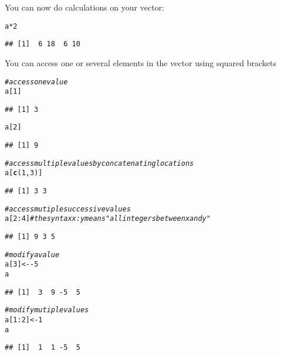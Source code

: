 \documentclass[12pt,a4paper]{scrartcl}\usepackage[]{graphicx}\usepackage[]{color}
\makeatletter
\newcommand{\hlnum}[1]{\textcolor[rgb]{0.686,0.059,0.569}{#1}}%
\newcommand{\hlcom}[1]{\textcolor[rgb]{0.678,0.584,0.686}{\textit{#1}}}%
\newcommand{\hlopt}[1]{\textcolor[rgb]{0,0,0}{#1}}%
\newcommand{\hlstd}[1]{\textcolor[rgb]{0.345,0.345,0.345}{#1}}%
\newcommand{\hlkwb}[1]{\textcolor[rgb]{0.69,0.353,0.396}{#1}}%
\newcommand{\hlkwd}[1]{\textcolor[rgb]{0.737,0.353,0.396}{\textbf{#1}}}%
\newenvironment{kframe}{%
 \def\at@end@of@kframe{}%
 \ifinner\ifhmode%
  \def\at@end@of@kframe{\end{minipage}}%
  \begin{minipage}{\columnwidth}%
 \fi\fi%
 \def\FrameCommand##1{\hskip\@totalleftmargin \hskip-\fboxsep
 \colorbox{shadecolor}{##1}\hskip-\fboxsep
     \hskip-\linewidth \hskip-\@totalleftmargin \hskip\columnwidth}%
 \MakeFramed {\advance\hsize-\width
   \@totalleftmargin\z@ \linewidth\hsize
   \@setminipage}}%
 {\par\unskip\endMakeFramed%
 \at@end@of@kframe}
\newenvironment{knitrout}{}{} %
\makeatother
\begin{document}
You can now do calculations on your vector:

\begin{knitrout}
\color{fgcolor}\begin{kframe}
\begin{alltt}
\hlstd{a} \hlopt{*} \hlnum{2}
\end{alltt}
\begin{verbatim}
## [1]  6 18  6 10
\end{verbatim}
\end{kframe}
\end{knitrout}

You can access one or several elements in the vector using squared brackets
\begin{knitrout}
\color{fgcolor}\begin{kframe}
\begin{alltt}
\hlcom{#access one value}
\hlstd{a[}\hlnum{1}\hlstd{]}
\end{alltt}
\begin{verbatim}
## [1] 3
\end{verbatim}
\begin{alltt}
\hlstd{a[}\hlnum{2}\hlstd{]}
\end{alltt}
\begin{verbatim}
## [1] 9
\end{verbatim}
\begin{alltt}
\hlcom{#access multiple values by concatenating locations}
\hlstd{a[}\hlkwd{c}\hlstd{(}\hlnum{1}\hlstd{,}\hlnum{3}\hlstd{)]}
\end{alltt}
\begin{verbatim}
## [1] 3 3
\end{verbatim}
\begin{alltt}
\hlcom{#access mutiple successive values}
\hlstd{a[}\hlnum{2}\hlopt{:}\hlnum{4}\hlstd{]}\hlcom{#the syntax x:y means "all integers between x and y"}
\end{alltt}
\begin{verbatim}
## [1] 9 3 5
\end{verbatim}
\begin{alltt}
\hlcom{#modify a value}
\hlstd{a[}\hlnum{3}\hlstd{]} \hlkwb{<-} \hlopt{-}\hlnum{5}
\hlstd{a}
\end{alltt}
\begin{verbatim}
## [1]  3  9 -5  5
\end{verbatim}
\begin{alltt}
\hlcom{#modify mutiple values}
\hlstd{a[}\hlnum{1}\hlopt{:}\hlnum{2}\hlstd{]} \hlkwb{<-} \hlnum{1}
\hlstd{a}
\end{alltt}
\begin{verbatim}
## [1]  1  1 -5  5
\end{verbatim}
\end{kframe}
\end{knitrout}
\end{document}
